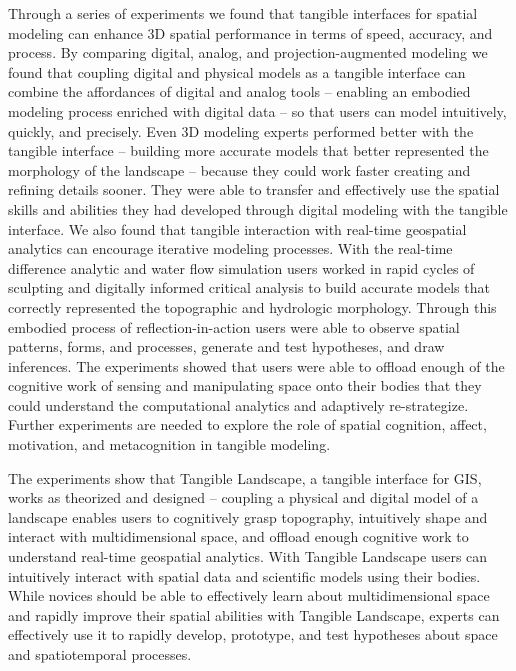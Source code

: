\documentclass[Afour,sageh,times]{sagej}
\begin{document}
Through a series of experiments
we found that tangible interfaces for spatial modeling
can enhance 3D spatial performance 
in terms of speed, accuracy, and process. 
By comparing digital, analog, and projection-augmented modeling 
we found that coupling digital and physical models as a tangible interface 
can combine the affordances of digital and analog tools
-- enabling an embodied modeling process enriched with digital data --
so that users can model intuitively, quickly, and precisely. 
Even 3D modeling experts 
 performed better with the tangible interface 
-- building more accurate models 
that better represented the morphology of the landscape --
 because they could work faster
 creating and refining details sooner.
They were able to transfer and effectively use the
spatial skills and abilities they had developed through digital modeling
with the tangible interface.
We also found that tangible interaction with real-time geospatial analytics
can encourage iterative modeling processes.
With the real-time difference analytic and water flow simulation  
users worked in rapid cycles of 
sculpting and digitally informed critical analysis
to build accurate models that
correctly represented the topographic and hydrologic morphology.
Through this embodied process of reflection-in-action 
users were able to
observe spatial patterns, forms, and processes, 
generate and test hypotheses, 
and draw inferences. 
The experiments showed that users 
were able to offload enough of the cognitive work 
of sensing and manipulating space
onto their bodies
that they could understand the
computational analytics
and adaptively re-strategize.
Further experiments are needed
to explore the role of 
spatial cognition, affect, motivation, and metacognition 
in tangible modeling.

The experiments show that Tangible Landscape,
a tangible interface for GIS, 
works as theorized and designed -- 
coupling a physical and digital model of a landscape
enables users to 
cognitively grasp topography,
intuitively shape and interact with multidimensional space, 
and offload enough cognitive work to understand 
real-time geospatial analytics. 
With Tangible Landscape users can intuitively interact with 
spatial data and scientific models using their bodies. 
While novices should be able to effectively learn about 
multidimensional space and
rapidly improve their spatial abilities 
with Tangible Landscape, 
experts can effectively use it to 
rapidly develop, prototype, and test 
hypotheses about space and spatiotemporal processes.
\end{document}
